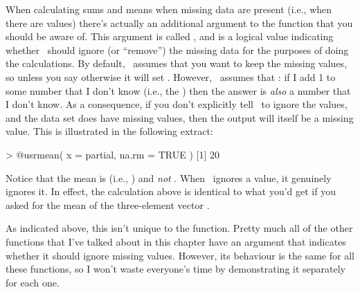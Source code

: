 When calculating sums and means when missing data are present (i.e., when there are  values) there's actually an additional argument to the function that you should be aware of. This argument is called , and is a logical value indicating whether \R\ should ignore (or ``remove'') the missing data for the purposes of doing the calculations. By default, \R\ assumes that you want to keep the missing values, so unless you say otherwise it will set . However, \R\ assumes that : if I add 1 to some number that I don't know (i.e., the ) then the answer is {\it also} a number that I don't know. As a consequence, if you don't explicitly tell \R\ to ignore the  values, and the data set does have missing values, then the output will itself be a missing value. This is illustrated in the following extract:
\begin{rblock1}
> @usr{mean( x = partial, na.rm = TRUE )}
[1] 20
\end{rblock1}
Notice that the mean is   (i.e., ) and {\it not} . When \R\ ignores a  value, it genuinely ignores it. In effect, the calculation above is identical to what you'd get if you asked for the mean of the three-element vector .

As indicated above, this isn't unique to the  function. Pretty much all of the other functions that I've talked about in this chapter have an  argument that indicates whether it should ignore missing values. However, its behaviour is the same for all these functions, so I won't waste everyone's time by demonstrating it separately for each one.



